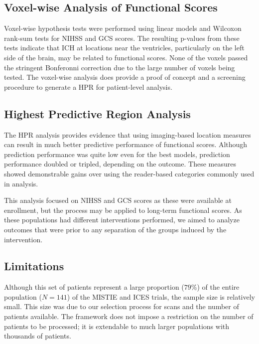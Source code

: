 \documentclass[10pt]{article}\usepackage[]{graphicx}\usepackage[]{color}
\begin{document}
\subsection{Voxel-wise Analysis of Functional Scores}

Voxel-wise hypothesis tests were performed using linear models and Wilcoxon rank-sum tests for NIHSS and GCS scores.  The resulting p-values from these tests indicate that ICH at locations near the ventricles, particularly on the left side of the brain, may be related to functional scores.  
None of the voxels passed the stringent  Bonferonni correction due to the large number of voxels being tested. The voxel-wise analysis does provide a proof of concept and a screening procedure to generate a HPR for patient-level analysis.

\subsection{Highest Predictive Region Analysis}

The HPR analysis provides evidence that using imaging-based location measures can result in much better predictive performance of functional scores.  Although prediction performance was quite low even for the best models, prediction performance doubled or tripled, depending on the outcome.  These measures showed demonstrable gains over using the reader-based categories commonly used in analysis.

This analysis focused on NIHSS and GCS scores as these were available at enrollment, but the process may be applied to long-term functional scores.  As these populations had different interventions performed, we aimed to analyze outcomes that were prior to any separation of the groups induced by the intervention.  

\subsection{Limitations}

Although this set of patients represent a large proportion ($79$\%) of the entire population ($N=141$) of the MISTIE and ICES trials, the sample size is relatively small.  This size was due to our selection process for scans and the number of patients available.  The framework does not impose a restriction on the number of patients to be processed; it is extendable to much larger populations with thousands of patients.
\end{document}
